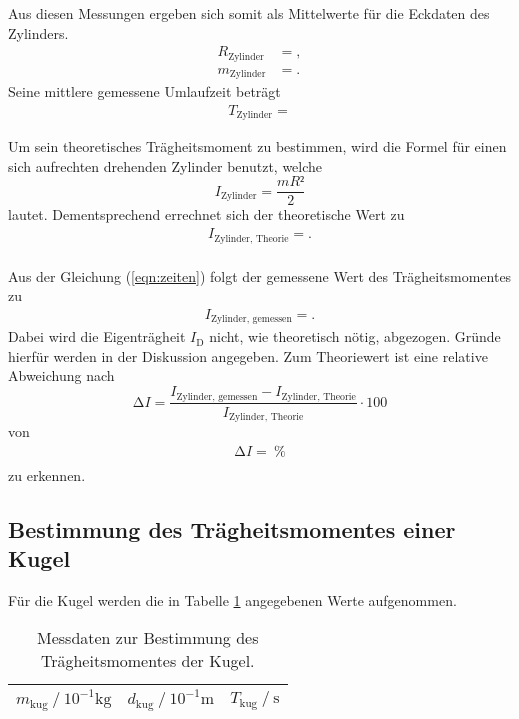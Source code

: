 Aus diesen Messungen ergeben sich somit als Mittelwerte für die Eckdaten des Zylinders.
\begin{align*}
  R_{\text{Zylinder}} &= , \\
  m_{\text{Zylinder}} &= .
\end{align*}
Seine mittlere gemessene Umlaufzeit beträgt
\begin{align*}
  T_{\text{Zylinder}} = 
\end{align*}

Um sein theoretisches Trägheitsmoment zu bestimmen, wird die Formel für einen sich aufrechten drehenden Zylinder benutzt, welche
\begin{equation}
  I_{\text{Zylinder}} = \frac{mR²}{2}
\end{equation}
lautet.
Dementsprechend errechnet sich der theoretische Wert zu
\begin{align*}
  I_{\text{Zylinder, Theorie}} = . \\
\end{align*}

Aus der Gleichung (\ref{eqn:zeiten}) folgt der gemessene Wert des Trägheitsmomentes zu
\begin{align*}
  I_{\text{Zylinder, gemessen}} = .
\end{align*}
Dabei wird die Eigenträgheit $I_\text{D}$ nicht, wie theoretisch nötig, abgezogen.
Gründe hierfür werden in der Diskussion angegeben.
Zum Theoriewert ist eine relative Abweichung nach
\begin{equation}
  \increment I = \frac{I_{\text{Zylinder, gemessen}} - I_{\text{Zylinder, Theorie}}}{I_{\text{Zylinder, Theorie}}} \cdot 100
\end{equation}
von
\begin{align*}
  \increment I =  \:\si{\percent} \\
\end{align*}
zu erkennen.


\subsection{Bestimmung des Trägheitsmomentes einer Kugel}
Für die Kugel werden die in Tabelle \ref{tab:kug} angegebenen Werte aufgenommen.

\begin{table}[H]
  \centering
  \caption{Messdaten zur Bestimmung des Trägheitsmomentes der Kugel.}
  \label{tab:kug}
  \begin{tabular}{c c c}
    \toprule
    {$m_\text{kug} \ /\ 10^{-1} \si{\kilo\gram}$} & {$d_\text{kug} \ /\ 10^{-1} \si{\metre}$} & {$T_\text{kug} \ /\ \si{\second}$}\\
    \midrule
    
    \bottomrule
  \end{tabular}
\end{table}

